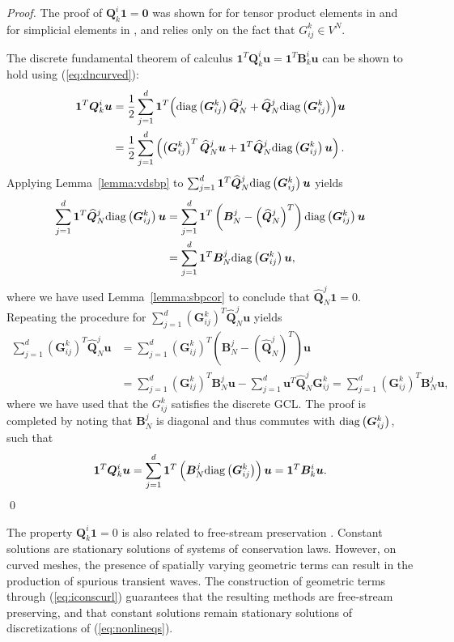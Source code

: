 \documentclass{svjour3}                     %
\renewcommand{\hat}{\widehat}
\newcommand{\diag}[1]{{\rm diag}\LRp{#1}}
\newcommand{\LRp}[1]{\left( #1 \right)}
\begin{document}
\begin{proof}
The proof of $\bm{Q}^i_k\bm{1} = \bm{0}$ was shown for for tensor product elements in \cite{kopriva2006metric} and for simplicial elements in \cite{chan2018discretely}, and relies only on the fact that $G^k_{ij} \in V^N$.  

The discrete fundamental theorem of calculus $\bm{1}^T\bm{Q}^i_k\bm{u} = \bm{1}^T\bm{B}^i_k\bm{u}$ can be shown to hold using (\ref{eq:dncurved}):
\begin{align*}
\bm{1}^T\bm{Q}^i_k\bm{u} &= \frac{1}{2}\sum_{j=1}^d \bm{1}^T{\LRp{\diag{\bm{G}^k_{ij}}\hat{\bm{Q}}^j_N + \hat{\bm{Q}}^j_N\diag{\bm{G}^k_{ij}}}} \bm{u} \\
&= \frac{1}{2}\sum_{j=1}^d \LRp{\LRp{\bm{G}^k_{ij}}^T \hat{\bm{Q}}^j_N\bm{u} + \bm{1}^T\hat{\bm{Q}}^j_N\diag{\bm{G}^k_{ij}}\bm{u}}.
\end{align*}
Applying Lemma~\ref{lemma:vdsbp} to $\sum_{j=1}^d\bm{1}^T\hat{\bm{Q}}^j_N\diag{\bm{G}^k_{ij}}\bm{u}$ yields
\begin{align*}
\sum_{j=1}^d\bm{1}^T\hat{\bm{Q}}^j_N\diag{\bm{G}^k_{ij}}\bm{u} &= \sum_{j=1}^d\bm{1}^T\LRp{\bm{B}^j_N - \LRp{\hat{\bm{Q}}^j_N}^T}\diag{\bm{G}^k_{ij}}\bm{u} \\
&= \sum_{j=1}^d\bm{1}^T\bm{B}^j_N \diag{\bm{G}^k_{ij}}\bm{u},
\end{align*}
where we have used Lemma~\ref{lemma:sbpcor} to conclude that $\hat{\bm{Q}}^j_N \bm{1} = 0$.
Repeating the procedure for $\sum_{j=1}^d \LRp{\bm{G}^k_{ij}}^T \hat{\bm{Q}}^j_N\bm{u}$ yields
\begin{align*}
\sum_{j=1}^d \LRp{\bm{G}^k_{ij}}^T \hat{\bm{Q}}^j_N\bm{u} &= \sum_{j=1}^d \LRp{\bm{G}^k_{ij}}^T \LRp{\bm{B}^j_N - \LRp{\hat{\bm{Q}}^j_N}^T}\bm{u} \\
&= \sum_{j=1}^d \LRp{\bm{G}^k_{ij}}^T \bm{B}^j_N \bm{u} - \sum_{j=1}^d \bm{u}^T{\hat{\bm{Q}}^j_N}{\bm{G}^k_{ij}} = \sum_{j=1}^d \LRp{\bm{G}^k_{ij}}^T \bm{B}^j_N \bm{u},  
\end{align*}
where we have used that the $G^k_{ij}$ satisfies the discrete GCL.  The proof is completed by noting that $\bm{B}^j_N$ is diagonal and thus commutes with $\diag{\bm{G}^k_{ij}}$, such that
\[
\bm{1}^T\bm{Q}^i_k\bm{u} = \sum_{j=1}^d\bm{1}^T\LRp{\bm{B}^j_N \diag{\bm{G}^k_{ij}}}\bm{u} = \bm{1}^T\bm{B}^i_k \bm{u}.
\]
\qed\end{proof}

The property $\bm{Q}^i_k\bm{1} = 0$ is also related to free-stream preservation \cite{kopriva2006metric}.  Constant solutions are stationary solutions of systems of conservation laws.  However, on curved meshes, the presence of spatially varying geometric terms can result in the production of spurious transient waves.  The construction of geometric terms through (\ref{eq:iconscurl}) guarantees that the resulting methods are free-stream preserving, and that constant solutions remain stationary solutions of discretizations of (\ref{eq:nonlineqs}).
\end{document}
